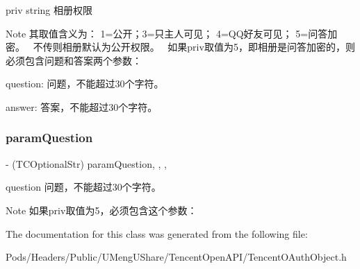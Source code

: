 priv string 相册权限

\begin{DoxyNote}{Note}
其取值含义为： 1=公开；3=只主人可见； 4=Q\+Q好友可见； 5=问答加密。~\newline
 不传则相册默认为公开权限。~\newline
 如果priv取值为5，即相册是问答加密的，则必须包含问题和答案两个参数：~\newline

\begin{DoxyItemize}
\item question\+: 问题，不能超过30个字符。
\item answer\+: 答案，不能超过30个字符。 
\end{DoxyItemize}
\end{DoxyNote}
\mbox{\label{interface_t_c_add_album_dic_a3231e7f93290532c98fe6704d4c5b1ea}} 
\subsubsection{\texorpdfstring{param\+Question}{paramQuestion}}
{\footnotesize\ttfamily -\/ (T\+C\+Optional\+Str) param\+Question\hspace{0.3cm}{\ttfamily [read]}, {\ttfamily [write]}, {\ttfamily [nonatomic]}, {\ttfamily [retain]}}

question 问题，不能超过30个字符。 \begin{DoxyNote}{Note}
如果priv取值为5，必须包含这个参数： 
\end{DoxyNote}


The documentation for this class was generated from the following file\+:\begin{DoxyCompactItemize}
\item 
Pods/\+Headers/\+Public/\+U\+Meng\+U\+Share/\+Tencent\+Open\+A\+P\+I/Tencent\+O\+Auth\+Object.\+h\end{DoxyCompactItemize}
